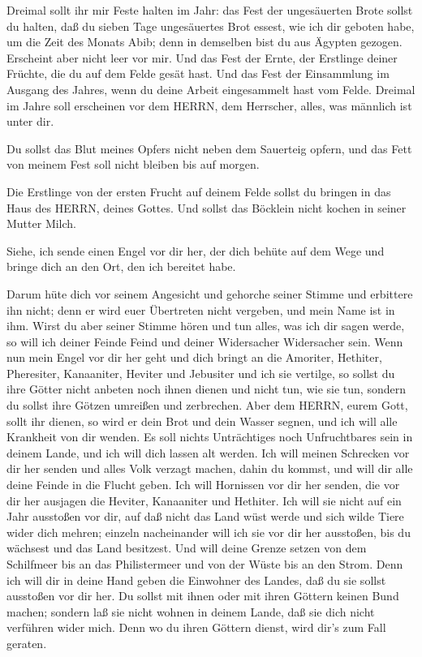  Dreimal sollt ihr mir Feste halten im Jahr: 
das Fest der ungesäuerten Brote sollst du halten, daß du sieben Tage
ungesäuertes Brot essest, wie ich dir geboten habe, um die Zeit des
Monats Abib; denn in demselben bist du aus Ägypten gezogen. Erscheint
aber nicht leer vor mir.  Und das Fest der Ernte, der
Erstlinge deiner Früchte, die du auf dem Felde gesät hast. Und das Fest
der Einsammlung im Ausgang des Jahres, wenn du deine Arbeit eingesammelt
hast vom Felde.  Dreimal im Jahre soll erscheinen vor dem
HERRN, dem Herrscher, alles, was männlich ist unter dir.

 Du sollst das Blut meines Opfers nicht neben dem Sauerteig
opfern, und das Fett von meinem Fest soll nicht bleiben bis auf morgen.

 Die Erstlinge von der ersten Frucht auf deinem Felde
sollst du bringen in das Haus des HERRN, deines Gottes. Und sollst das
Böcklein nicht kochen in seiner Mutter Milch.

 Siehe, ich sende einen Engel vor dir her, der dich behüte
auf dem Wege und bringe dich an den Ort, den ich bereitet habe.

 Darum hüte dich vor seinem Angesicht und gehorche seiner
Stimme und erbittere ihn nicht; denn er wird euer Übertreten nicht
vergeben, und mein Name ist in ihm.  Wirst du aber seiner
Stimme hören und tun alles, was ich dir sagen werde, so will ich deiner
Feinde Feind und deiner Widersacher Widersacher sein.  Wenn
nun mein Engel vor dir her geht und dich bringt an die Amoriter,
Hethiter, Pheresiter, Kanaaniter, Heviter und Jebusiter und ich sie
vertilge,  so sollst du ihre Götter nicht anbeten noch
ihnen dienen und nicht tun, wie sie tun, sondern du sollst ihre Götzen
umreißen und zerbrechen.  Aber dem HERRN, eurem Gott, sollt
ihr dienen, so wird er dein Brot und dein Wasser segnen, und ich will
alle Krankheit von dir wenden.  Es soll nichts Unträchtiges
noch Unfruchtbares sein in deinem Lande, und ich will dich lassen alt
werden.  Ich will meinen Schrecken vor dir her senden und
alles Volk verzagt machen, dahin du kommst, und will dir alle deine
Feinde in die Flucht geben.  Ich will Hornissen vor dir her
senden, die vor dir her ausjagen die Heviter, Kanaaniter und Hethiter.
 Ich will sie nicht auf ein Jahr ausstoßen vor dir, auf daß
nicht das Land wüst werde und sich wilde Tiere wider dich mehren;
 einzeln nacheinander will ich sie vor dir her ausstoßen,
bis du wächsest und das Land besitzest.  Und will deine
Grenze setzen von dem Schilfmeer bis an das Philistermeer und von der
Wüste bis an den Strom. Denn ich will dir in deine Hand geben die
Einwohner des Landes, daß du sie sollst ausstoßen vor dir her.
 Du sollst mit ihnen oder mit ihren Göttern keinen Bund
machen;  sondern laß sie nicht wohnen in deinem Lande, daß
sie dich nicht verführen wider mich. Denn wo du ihren Göttern dienst,
wird dir's zum Fall geraten.

